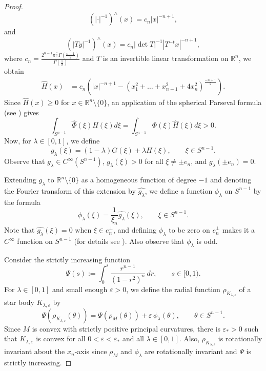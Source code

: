 \documentclass[12pt,letterpaper,reqno]{amsart}
\theoremstyle{definition}
\begin{document}
\begin{proof}
	$$\left(|\cdot|^{-1} \right)^\wedge (x) = c_n |x|^{-n+1},$$ 	and 
	$$\left(|T y|^{-1} \right)^\wedge (x) = c_n |\det T|^{-1} |T^{-t}x|^{-n+1},$$
	where 	  $c_{n} = \frac{2^{n-1} \pi^{\frac{n}2} \Gamma\left(\frac{n-1}2\right)}{\Gamma\left(\frac12\right)}$ and $T$ is an invertible linear transformation on $\mathbb R^n$, we obtain	
	\begin{align*}
		\widehat{H}(x) 
		&=c_n \left(|x|^{-n+1} - \left(x_1^2 + \dots + x_{n-1}^2 + 4x_n^2\right)^{\frac{-n+1}2}\right).
	\end{align*}
Since $\widehat{H} (x) \ge 0$ for $x\in \mathbb R^n\setminus\{0\}$, an application of the spherical Parseval formula (see \cite[Lemma 3.22]{K}) gives
	\begin{equation}\label{int_H}
		\int_{S^{n-1}} \widehat\Phi(\xi) H(\xi) d\xi =  \int_{S^{n-1}} \Phi(\xi) \widehat{H}(\xi) d\xi > 0.
		\end{equation}
	Now, for $\lambda\in [0,1]$,   we define 
	$$
	g_\lambda (\xi) = (1-\lambda)G (\xi) + \lambda H (\xi), \qquad  \xi\in S^{n-1}.
	$$
	Observe that $g_\lambda\in C^\infty(S^{n-1})$,  $g_{\lambda}(\xi) > 0$ for all $\xi \ne \pm e_n$, and $g_\lambda(\pm e_n) = 0$.
 
  Extending $g_\lambda$ to  $ \mathbb R^n\setminus\{0\}$ as a homogeneous function of degree $-1$ and denoting  the Fourier transform of this extension by $\widehat{g_\lambda}$, we define a function $\phi_\lambda$ on $S^{n-1}$ by the formula
	$$\phi_\lambda(\xi) = \frac{1}{\xi_n} \widehat{g_\lambda}(\xi), \qquad \xi\in S^{n-1}.$$
	Note that $\widehat{g_\lambda}(\xi)=0$ when $\xi\in e_n^\perp$, and   defining $\phi_\lambda$ to be zero on $e_n^\perp$ makes it a $C^\infty$ function on $S^{n-1}$ (for details see \cite[p.~8]{MTY2}).  Also observe that $\phi_\lambda$ is odd. 
	
	
Consider the strictly increasing function
	\begin{equation}\label{eq:def-Psi}
		\Psi(s) := \int_0^s \frac{r^{n-1}}{(1-r^2)^n}\,dr,\qquad s\in[0,1).
	\end{equation}
	For $\lambda\in[0,1]$ and  small enough $\varepsilon>0$, we define the radial
	function $\rho_{K_{\lambda,\varepsilon}}$  of a star body $K_{\lambda,\varepsilon}$ by
	\begin{equation}\label{eq:perturb}
		\Psi(\rho_{K_{\lambda,\varepsilon}}(\theta))
		= \Psi(\rho_M(\theta))+\varepsilon\,\phi_\lambda(\theta),
		\qquad \theta\in S^{n-1}.
	\end{equation}	
Since $M$ is convex with strictly positive principal curvatures, there is $\varepsilon_\ast>0$ such that	  $K_{\lambda,\varepsilon}$ is convex for all $0<\varepsilon <\varepsilon_\ast$ and all $\lambda\in[0,1]$.  Also, $\rho_{K_{\lambda,\varepsilon}}$ is rotationally invariant about the $x_n$-axis since $\rho_M$ and $\phi_\lambda$ are rotationally invariant and $\Psi$ is strictly increasing.


\end{proof}
\end{document}
